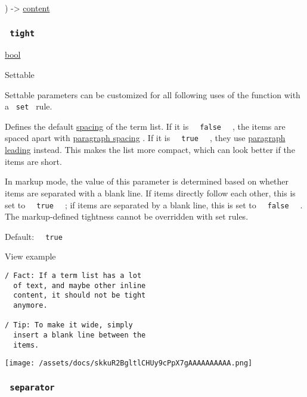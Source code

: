 ) -\textgreater{} \href{/docs/reference/foundations/content/}{content}

\subsubsection{\texorpdfstring{\texttt{\ tight\ }}{ tight }}\label{parameters-tight}

\href{/docs/reference/foundations/bool/}{bool}

{{ Settable }}

\label{parameters-tight-settable-tooltip}
Settable parameters can be customized for all following uses of the
function with a \texttt{\ set\ } rule.

Defines the default
\href{/docs/reference/model/terms/\#parameters-spacing}{spacing} of the
term list. If it is \texttt{\ }{\texttt{\ false\ }}\texttt{\ } , the
items are spaced apart with
\href{/docs/reference/model/par/\#parameters-spacing}{paragraph spacing}
. If it is \texttt{\ }{\texttt{\ true\ }}\texttt{\ } , they use
\href{/docs/reference/model/par/\#parameters-leading}{paragraph leading}
instead. This makes the list more compact, which can look better if the
items are short.

In markup mode, the value of this parameter is determined based on
whether items are separated with a blank line. If items directly follow
each other, this is set to \texttt{\ }{\texttt{\ true\ }}\texttt{\ } ;
if items are separated by a blank line, this is set to
\texttt{\ }{\texttt{\ false\ }}\texttt{\ } . The markup-defined
tightness cannot be overridden with set rules.

Default: \texttt{\ }{\texttt{\ true\ }}\texttt{\ }


View example

\begin{verbatim}
/ Fact: If a term list has a lot
  of text, and maybe other inline
  content, it should not be tight
  anymore.

/ Tip: To make it wide, simply
  insert a blank line between the
  items.
\end{verbatim}

\texttt{[image: /assets/docs/skkuR2BgltlCHUy9cPpX7gAAAAAAAAAA.png]}

\subsubsection{\texorpdfstring{\texttt{\ separator\ }}{ separator }}\label{parameters-separator}

